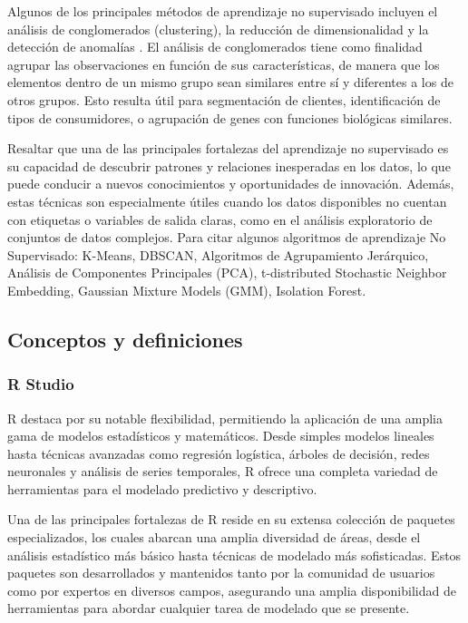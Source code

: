 \documentclass[
  11pt,
  bookmarksnumbered]{article}
\begin{document}
Algunos de los principales métodos de aprendizaje no supervisado incluyen el análisis de conglomerados (clustering), la reducción de dimensionalidad y la detección de anomalías \textcite{Witten2016}.
El análisis de conglomerados tiene como finalidad agrupar las observaciones en función de sus características, de manera que los elementos dentro de un mismo grupo sean similares entre sí y diferentes a los de otros grupos.
Esto resulta útil para segmentación de clientes, identificación de tipos de consumidores, o agrupación de genes con funciones biológicas similares.

Resaltar que una de las principales fortalezas del aprendizaje no supervisado es su capacidad de descubrir patrones y relaciones inesperadas en los datos, lo que puede conducir a nuevos conocimientos y oportunidades de innovación.
Además, estas técnicas son especialmente útiles cuando los datos disponibles no cuentan con etiquetas o variables de salida claras, como en el análisis exploratorio de conjuntos de datos complejos.
Para citar algunos algoritmos de aprendizaje No Supervisado: K-Means, DBSCAN, Algoritmos de Agrupamiento Jerárquico, Análisis de Componentes Principales (PCA), t-distributed Stochastic Neighbor Embedding, Gaussian Mixture Models (GMM), Isolation Forest.

\hypertarget{conceptos-y-definiciones}{%
\subsection{Conceptos y definiciones}\label{conceptos-y-definiciones}}

\hypertarget{r-studio}{%
\subsubsection{R Studio}\label{r-studio}}

R destaca por su notable flexibilidad, permitiendo la aplicación de una amplia gama de modelos estadísticos y matemáticos.
Desde simples modelos lineales hasta técnicas avanzadas como regresión logística, árboles de decisión, redes neuronales y análisis de series temporales, R ofrece una completa variedad de herramientas para el modelado predictivo y descriptivo.

Una de las principales fortalezas de R reside en su extensa colección de paquetes especializados, los cuales abarcan una amplia diversidad de áreas, desde el análisis estadístico más básico hasta técnicas de modelado más sofisticadas.
Estos paquetes son desarrollados y mantenidos tanto por la comunidad de usuarios como por expertos en diversos campos, asegurando una amplia disponibilidad de herramientas para abordar cualquier tarea de modelado que se presente.
\end{document}
